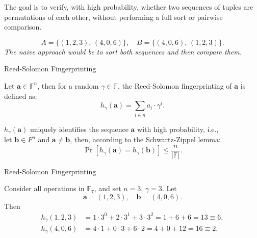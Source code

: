 \documentclass{zkdl-presentation-template}
\begin{document}
    \begin{frame}
        The goal is to verify, with high probability, whether two sequences of tuples
        are permutations of each other, without performing a full sort or pairwise comparison.

        \pause
        \begin{equation*}
        A = \{(1,2,3),\,(4,0,6)\}, \quad
        B = \{(4,0,6),\,(1,2,3)\}.
        \end{equation*}
        \textit{The naive approach would be to sort both sequences and then compare them.}
    \end{frame}

    \begin{frame}{Reed-Solomon Fingerprinting}
        \begin{definition}
            Let $\mathbf{a} \in \mathbb{F}^{n}$, then for a random $\gamma \in \mathbb{F}$, the Reed-Solomon 
            fingerprinting of $\mathbf{a}$ is defined as:
            \begin{equation*}
                h_{\gamma}(\mathbf{a}) = \sum_{i \in n} a_i \cdot \gamma^i.
            \end{equation*}

            \pause
            $h_{\gamma}(\mathbf{a})$ uniquely identifies the sequence $\mathbf{a}$ with high probability,
            i.e., \\let $\mathbf{b} \in F^n$ and $\mathbf{a} \neq \mathbf{b}$, then, according to the Schwartz-Zippel lemma:
            \begin{equation*}
                \Pr[h_{\gamma}(\mathbf{a}) = h_{\gamma}(\mathbf{b})] \leq \frac{n}{|\mathbb{F}|}.
            \end{equation*}
        \end{definition}
    \end{frame}

    \begin{frame}{Reed-Solomon Fingerprinting}
        \begin{example}
            Consider all operations in $\mathbb{F}_7$, and set $n=3$, $\gamma=3$.  
            Let
            \begin{equation*}
                \mathbf{a} = (1,2,3), \quad \mathbf{b} = (4,0,6).
            \end{equation*}
            Then
            \begin{align*}
                h_{\gamma}(1,2,3) &=1\cdot3^0 + 2\cdot3^1 + 3\cdot3^2 =1 + 6 + 6 =13 \equiv 6,\\
                h_{\gamma}(4,0,6) &=4\cdot1 + 0\cdot3 + 6\cdot2 =4 + 0 + 12 =16 \equiv 2.
            \end{align*}
        \end{example}
    \end{frame}
\end{document}

